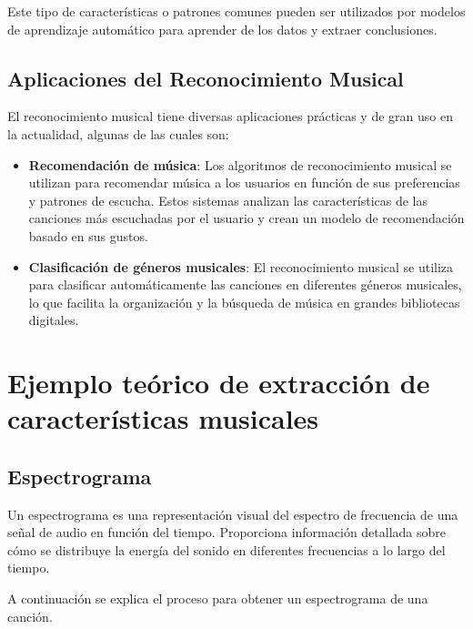 Este tipo de características o patrones comunes pueden ser utilizados por modelos de aprendizaje automático para aprender de los datos y extraer conclusiones.

\subsection{Aplicaciones del Reconocimiento Musical}
El reconocimiento musical tiene diversas aplicaciones prácticas y de gran uso en la actualidad, algunas de las cuales son:

\begin{itemize}
\item \textbf{Recomendación de música}: Los algoritmos de reconocimiento musical se utilizan para recomendar música a los usuarios en función de sus preferencias y patrones de escucha. 
Estos sistemas analizan las características de las canciones más escuchadas por el usuario y crean un modelo de recomendación basado en sus gustos.

\item \textbf{Clasificación de géneros musicales}: El reconocimiento musical se utiliza para clasificar automáticamente las canciones en diferentes géneros musicales, lo que facilita la organización y la búsqueda de música en grandes bibliotecas digitales.
\end{itemize}

\section{Ejemplo teórico de extracción de características musicales}

\subsection{Espectrograma}
Un espectrograma es una representación visual del espectro de frecuencia de una señal de audio en función del tiempo. 
Proporciona información detallada sobre cómo se distribuye la energía del sonido en diferentes frecuencias a lo largo del tiempo.

A continuación se explica el proceso para obtener un espectrograma de una canción. \cite{Gartzman_2020}

